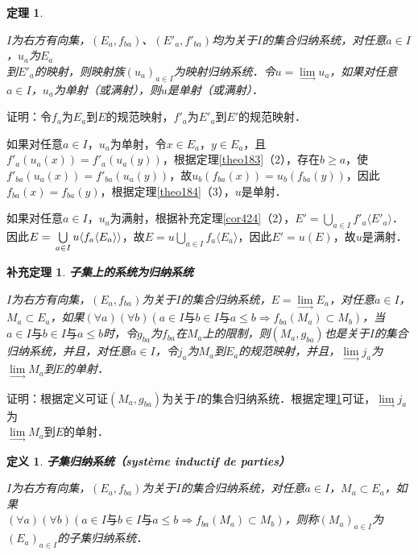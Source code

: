 \documentclass[12pt, a4paper, oneside]{book}
\newtheorem{theo}{定理}
\newtheorem{cor}{补充定理}
\newtheorem{de}{定义}
\begin{document}
			\begin{theo}\label{theo187}
				\hfill\par
				$I$为右方有向集，$(E_a, f_{ba})$、$({E'}_a, {f'}_{ba})$均为关于$I$的集合归纳系统，对任意$a\in I$，$u_a$为$E_a$\\到${E'}_a$的映射，则映射族$(u_a)_{a\in I}$为映射归纳系统．令$u=\lim\limits_\to u_a$，如果对任意$a\in I$，$u_a$为单射（或满射），则$u$是单射（或满射）．
			\end{theo}
			证明：令$f_a$为$E_a$到$E$的规范映射，${f'}_a$为${E'}_a$到$E'$的规范映射．
			\par
			如果对任意$a\in I$，$u_a$为单射，令$x\in E_a$，$y\in E_a$，且${f'}_a(u_a(x))={f'}_a(u_a(y))$，根据定理\ref{theo183}（2），存在$b\geq a$，使${f'}_{ba}(u_a(x))={f'}_{ba}(u_a(y))$，故$u_b(f_{ba}(x))=u_b(f_{ba}(y))$，因此$f_{ba}(x)=f_{ba}(y)$，根据定理\ref{theo184}（3），$u$是单射．
			\par
			如果对任意$a\in I$，$u_a$为满射，根据补充定理\ref{cor424}（2），$E'=\bigcup\limits_{a\in I}{f'}_a\langle{E'}_a\rangle$．因此$E=\\\bigcup\limits_{a\in I}u\langle f_a\langle E_a\rangle\rangle$，故$E=u\bigcup\limits_{a\in I}f_a\langle E_a\rangle$，因此$E'=u(E)$，故$u$是满射．
			
			\begin{cor}\label{cor428}
				\textbf{子集上的系统为归纳系统}
				\par
				$I$为右方有向集，$(E_a, f_{ba})$为关于$I$的集合归纳系统，$E= \lim\limits_\to E_a$，对任意$a\in I$，$M_a\subset E_a$，如果$(\forall a)(\forall b)(a\in I\text{与}b\in I\text{与}a\leq b\Rightarrow f_{ba}(M_a)\subset M_b)$，当$a\in I\text{与}b\in I\text{与}a\leq b$时，令$g_{ba}$为$f_{ba}$在$M_a$上的限制，则$(M_a, g_{ba})$也是关于$I$的集合归纳系统，并且，对任意$a\in I$，令$j_a$为$M_a$到$E_a$的规范映射，并且，$\lim\limits_\to j_a$为$\lim\limits_\to M_a$到$E$的单射．
			\end{cor}
			证明：根据定义可证$(M_a, g_{ba})$为关于$I$的集合归纳系统．根据定理\ref{theo187}可证，$\lim\limits_\to j_a$为\\$\lim\limits_\to M_a$到$E$的单射．
			
			\begin{de}
				\textbf{子集归纳系统（système inductif de parties）}
				\par
				$I$为右方有向集，$(E_a, f_{ba})$为关于$I$的集合归纳系统，对任意$a\in I$，$M_a\subset E_a$，如果\\$(\forall a)(\forall b)(a\in I\text{与}b\in I\text{与}a\leq b\Rightarrow f_{ba}(M_a)\subset M_b)$，则称$(M_a)_{a\in I}$为$(E_a)_{a\in I}$的子集归纳系统．
			\end{de}
					
\end{document}
